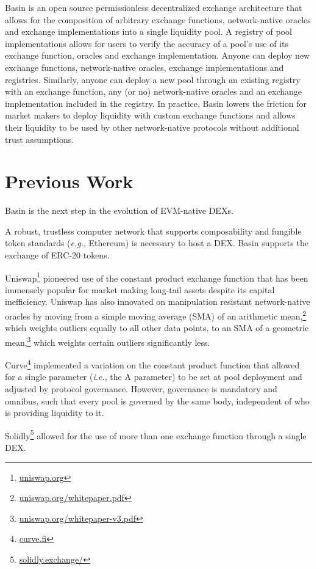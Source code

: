 \documentclass[tikz]{article}
\newcommand{\fref}[1]{\footnote{\href{http://#1}{#1}}}
\begin{document}
Basin is an open source permissionless decentralized exchange architecture that allows for the composition of arbitrary exchange functions, network-native oracles and exchange implementations into a single liquidity pool. A registry of pool implementations allows for users to verify the accuracy of a pool's use of its exchange function, oracles and exchange implementation. Anyone can deploy new exchange functions, network-native oracles, exchange implementations and registries. Similarly, anyone can deploy a new pool through an existing registry with an exchange function, any (or no) network-native oracles and an exchange implementation included in the registry. In practice, Basin lowers the friction for market makers to deploy liquidity with custom exchange functions
 and allows their liquidity to be used by other network-native protocols without additional trust assumptions.

\section{Previous Work}
Basin is the next step in the evolution of EVM-native DEXs.

A robust, trustless computer network that supports composability and fungible token standards (\textit{e.g.}, Ethereum) is necessary to host a DEX. Basin supports the exchange of ERC-20 tokens.

Uniswap\fref{uniswap.org} pioneered use of the constant product exchange function that has been immensely popular for market making long-tail assets despite its capital inefficiency. Uniswap has also innovated on manipulation resistant network-native oracles by moving from a simple moving average (SMA) of an arithmetic mean,\fref{uniswap.org/whitepaper.pdf} which weights outliers equally to all other data points, to an SMA of a geometric mean,\fref{uniswap.org/whitepaper-v3.pdf} which weights certain outliers significantly less.

Curve\fref{curve.fi} implemented a variation on the constant product function that allowed for a single parameter (\textit{i.e.}, the A parameter) to be set at pool deployment and adjusted by protocol governance. However, governance is mandatory and omnibus, such that every pool is governed by the same body, independent of who is providing liquidity to it.

Solidly\fref{solidly.exchange/} allowed for the use of more than one exchange function through a single DEX. 
\end{document}
